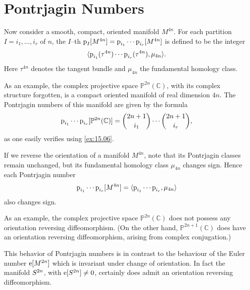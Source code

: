 \documentclass[../main]{subfiles}
\begin{document}
\section{Pontrjagin Numbers}
Now consider a smooth, compact, oriented manifold $M^{4n}$. For each partition $I = i_1, \ldots, i_r$ of $n$, the $I$--th  $\operatorname{p}_I[M^{4n}] = \operatorname{p}_{i_1} \cdots \operatorname{p}_{i_r} [M^{4n}]$ is defined to be the integer \[\langle\operatorname{p}_{i_1} (\tau^{4n}) \cdots \operatorname{p}_{i_r}(\tau^{4n}),\mu_{4n}\rangle.\] Here $\tau^{4n}$ denotes the tangent bundle and $\mu_{4n}$ the fundamental homology class. 

As an example, the complex projective space ${\mathbb P}^{2n}(\mathbb C)$, with its complex structure forgotten, is a compact oriented manifold of real dimension $4 n$. The Pontrjagin numbers of this manifold are given by the formula \[\operatorname{p}_{i_1} \cdots \operatorname{p}_{i_r} [{\mathbb P}^{2n}(\mathbb C)] = \binom {2n + 1} {i_1} \cdots \binom {2n + 1} {i_r},\] as one easily verifies using \ref{ex:15.06}. 

If we reverse the orientation of a manifold $M^{4n}$, note that its Pontrjagin classes remain unchanged, but its fundamental homology class $\mu_{4n}$ changes sign. Hence each Pontrjagin number \[\operatorname{p}_{i_1} \cdots \operatorname{p}_{i_r} [M^{4n}] = \langle\operatorname{p}_{i_1} \cdots \operatorname{p}_{i_r},\mu_{4n}\rangle\] also changes sign.  

As an example, the complex projective space ${\mathbb P}^{2n}(\mathbb C)$ does not possess any orientation reversing diffeomorphism. (On the other hand, ${\mathbb P}^{2n + 1}(\mathbb C)$ does have an orientation reversing diffeomorphism, arising from complex conjugation.) 

This behavior of Pontrjagin numbers is in contrast to the behaviour of the Euler number $\operatorname{e}[M^{2n}]$ which is invariant under change of orientation. In fact the manifold $S^{2n}$, with $\operatorname{e}[S^{2n}] \ne 0$, certainly does admit an orientation reversing diffeomorphism. 
\end{document}
